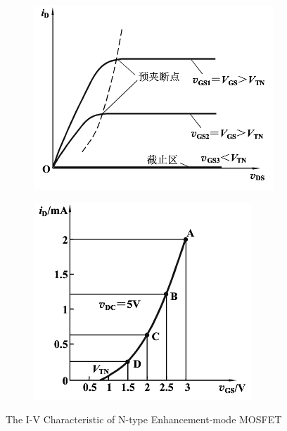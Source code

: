 \begin{figure}[H]
  \centering
  \begin{subfigure}{.5\textwidth}
    \centering
    \includegraphics[width=\linewidth]{figures/ENMOSIV1}
    \label{fig:}
  \end{subfigure}%
  \begin{subfigure}{.5\textwidth}
    \centering
    \includegraphics[width=\linewidth]{figures/ENMOSIV2}
    \label{fig:}
  \end{subfigure}
  \caption{The I-V Characteristic of N-type Enhancement-mode MOSFET}
  \label{fig:}
\end{figure}

